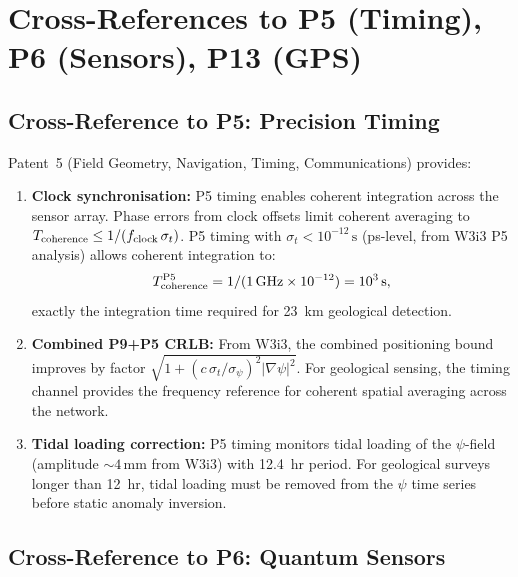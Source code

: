 \documentclass[aps,prd,twocolumn,superscriptaddress,nofootinbib]{revtex4-2}
\begin{document}
\section{Cross-References to P5 (Timing), P6 (Sensors), P13 (GPS)}
\label{sec:crossrefs}

\subsection{Cross-Reference to P5: Precision Timing}
\label{sec:p5cross}

Patent~5 (Field Geometry, Navigation, Timing, Communications) provides:
\begin{enumerate}
\item \textbf{Clock synchronisation:} P5 timing enables coherent
  integration across the sensor array.  Phase errors from clock offsets
  limit coherent averaging to $T_{\rm coherence} \leq 1/(f_{\rm clock}\,\sigma_t)$.
  P5 timing with $\sigma_t < 10^{-12}\,\mathrm{s}$ (ps-level,
  from W3i3 P5 analysis) allows coherent integration to:
  \begin{equation}
    T_{\rm coherence}^{\rm P5} = 1/(1\,\mathrm{GHz}\times10^{-12}) = 10^3\,\mathrm{s},
    \label{eq:t-coherence}
  \end{equation}
  exactly the integration time required for 23~km geological detection.

\item \textbf{Combined P9+P5 CRLB:} From W3i3, the combined positioning
  bound improves by factor $\sqrt{1 + (c\,\sigma_t/\sigma_\psi)^2|\nabla\psi|^2}$.
  For geological sensing, the timing channel provides the frequency
  reference for coherent spatial averaging across the network.

\item \textbf{Tidal loading correction:} P5 timing monitors tidal
  loading of the $\psi$-field (amplitude $\sim 4\,\mathrm{mm}$ from
  W3i3) with 12.4~hr period.  For geological surveys longer than
  12~hr, tidal loading must be removed from the $\psi$ time series
  before static anomaly inversion.
\end{enumerate}

\subsection{Cross-Reference to P6: Quantum Sensors}
\label{sec:p6cross2}
\end{document}
